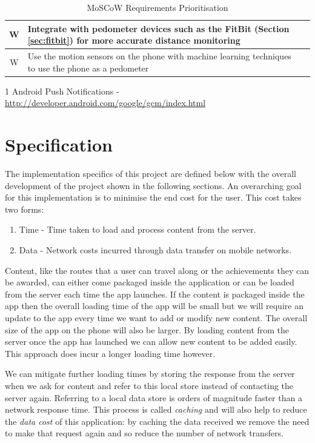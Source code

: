 \begin{table}[h]
\begin{threeparttable}[b]
\begin{tabular}{ | c | p{12cm} | c | }
    \\\hline
    W & Integrate with pedometer devices such as the FitBit (Section
    \ref{sec:fitbit}) for more accurate distance monitoring &
    \\\hline
    W & Use the motion sensors on the phone with machine learning
    techniques to use the phone as a pedometer & \\\hline
  \end{tabular}
  \begin{tablenotes}
    \item[1] Android Push Notifications - \url{http://developer.android.com/google/gcm/index.html}
  \end{tablenotes}
  \caption{MoSCoW Requirements Prioritisation}
  \label{table:moscow}
  \end{threeparttable}
\end{table}

\section{Specification}
\label{sec:specification}
The implementation specifics of this project are defined below with
the overall development of the project shown in the following sections.
An overarching goal for this implementation is to minimise the end cost
for the user. This cost takes two forms: 
\begin{enumerate}
\item Time - Time taken to load and process content from the server.
\item Data - Network costs incurred through data transfer on mobile networks.
\end{enumerate}

Content, like the routes that a user can travel along or the
achievements they can be awarded, can either come packaged inside the
application or can be loaded from the server each time the app
launches. If the content is packaged inside the app then the overall
loading time of the app will be small but we will require an update to
the app every time we want to add or modify new content. The overall
size of the app on the phone will also be larger. By loading content
from the server once the app has launched we can allow new content to
be added easily. This approach does incur a longer loading time however.

We can mitigate further loading times by storing the response from the
server when we ask for content and refer to this local store
instead of contacting the server again. Referring to a local data
store is orders of magnitude faster than a network response time. This
process is called \emph{caching} and will also help to reduce the
\emph{data cost} of this application: by caching the data received we
remove the need to make that request again and so reduce the number of
network transfers. 

